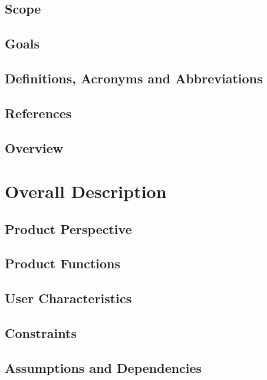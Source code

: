 \documentclass[a4paper,12pt]{report}
\begin{document}
	\section{Scope}

	\section{Goals}
	

	\section{Definitions, Acronyms and Abbreviations}
	

	\section{References}

	\section{Overview}

	\chapter{Overall Description}
	\label{ch:Overall_Description}

	\section{Product Perspective}

	\section{Product Functions}

	\section{User Characteristics}

	\section{Constraints}

	\section{Assumptions and Dependencies}
\end{document}
